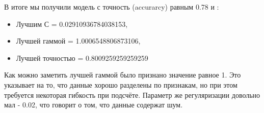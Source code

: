\begin{enumerate}
\begin{figure}[H]
    \end{figure}
В итоге мы получили модель с точность (accurarcy) равным 0.78 и :
\begin{itemize}
    \item Лучшим С =  0.02910936784038153,
    \item Лучшей гаммой = 1.0006548806873106,
    \item Лучшей точностью = 0.8009259259259259
\end{itemize}

    
Как можно заметить лучшей гаммой было признано значение равное 1. Это указывает на то, что данные хорошо разделены по признакам, но при этом требуется некоторая гибкость при подсчёте. Параметр же регуляризации довольно мал - 0.02, что говорит о том, что данные содержат шум.

\end{enumerate}
